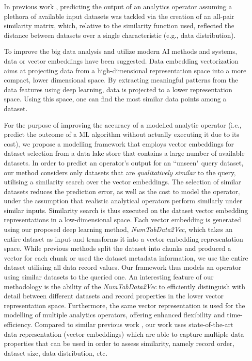 In previous work \cite{b7Apollo1}, predicting the output of an analytics operator assuming a plethora of available input datasets was tackled via the creation of an all-pair similarity matrix, which, relative to the similarity function used, reflected the distance between datasets over a single characteristic (e.g., data distribution). 

To improve the big data analysis and utilize modern AI methods and systems, data or vector embeddings have been suggested. Data embedding vectorization \cite{b8Word2Vec, b9Graph2Vec} aims at projecting data from a high-dimensional representation space into a more compact, lower dimensional space. By extracting meaningful patterns from the data features using deep learning, data is projected to a lower representation space. Using this space, one can find the most similar data points among a dataset.   

For the purpose of improving the accuracy of a modelled analytic operator (i.e., predict the outcome of a ML algorithm without actually executing it due to its cost), we propose a modelling framework that employs vector embeddings for dataset selection from a data lake store that contains a large number of available datasets. In order to predict an operator's output for an ``unseen" query dataset, our method considers only datasets that are \emph{qualitatively similar} to the query, utilising a similarity search over the vector embeddings. The selection of similar datasets reduces the prediction error, as well as the cost to model the operator, under the assumption that realistic analytical operators perform similarly under similar inputs. Similarity search is thus executed on the dataset vector embedding representations in a low-dimensional space. Each vector embedding is generated using our proposed deep learning method, \textit{NumTabData2Vec}, which takes an entire dataset as input and transforms it into a vector embedding representation space. While previous methods split the dataset into chunks and produced a vector for each chunk or used the dataset metadata information, we use the entire dataset utilising all data record values. Our framework thus models an operator using similar datasets to the queried one. An interesting feature of our methodology is the ability of the \textit{NumTabData2Vec} to efficiently distinguish with detail between different datasets and record properties in the lower vector representation space. Furthermore, the same vector representation is used for the modelling of multiple analytics operators, offering enhanced flexibility and time-efficiency.
Compared to similar previous work \cite{b7Apollo1, b7Apollo2}, our work uses state-of-the-art data representation (vector embeddings) which are able to capture multiple data properties that can be used in order to assess similarity, namely record order, dataset size, data distribution, etc. 


